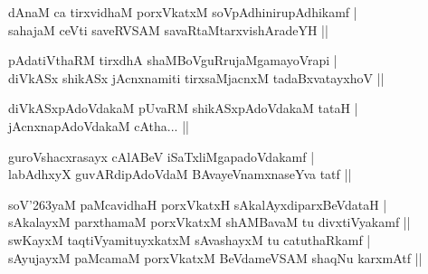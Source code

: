 \begin{entry}
\medskip
\begin{shl}
dAnaM ca tirxvidhaM porxVkatxM soVpAdhinirupAdhikamf |\\[2pt]
sahajaM ceVti saveRVSAM savaRtaMtarxvishAradeYH ||\\[-1pt]
\end{shl}
\medskip
{}
\vskip 5pt
\vskip 5pt
\medskip
\begin{shl}
pAdatiVthaRM tirxdhA shaMBoVguRrujaMgamayoVrapi |\\[2pt]
diVkASx shikASx jAcnxnamiti tirxsaMjacnxM tadaBxvatayxhoV ||\\[-1pt]
\end{shl}
\medskip
{}
\medskip
\begin{shl}
diVkASxpAdoVdakaM pUvaRM shikASxpAdoVdakaM tataH |\\[2pt]
jAcnxnapAdoVdakaM cAtha... ||\\[-1pt]
\end{shl}
\medskip
{}
\medskip
\begin{shl}
guroVshacxrasayx cAlABeV iSaTxliMgapadoVdakamf |\\[2pt]
labAdhxyX guvARdipAdoVdaM BAvayeVnamxnaseYva tatf ||\\[-1pt]
\end{shl}
\medskip
{}
\smallskip
{}
\medskip
\begin{shl}
soV{\char'263}yaM paMcavidhaH porxVkatxH sAkalAyxdiparxBeVdataH |\\[2pt]
sAkalayxM parxthamaM porxVkatxM shAMBavaM tu divxtiVyakamf ||\\[2pt]
swKayxM taqtiVyamituyxkatxM sAvashayxM tu catuthaRkamf |\\[2pt]
sAyujayxM paMcamaM porxVkatxM BeVdameVSAM shaqNu karxmAtf ||\\[-1pt]

\end{shl}
\end{entry}
